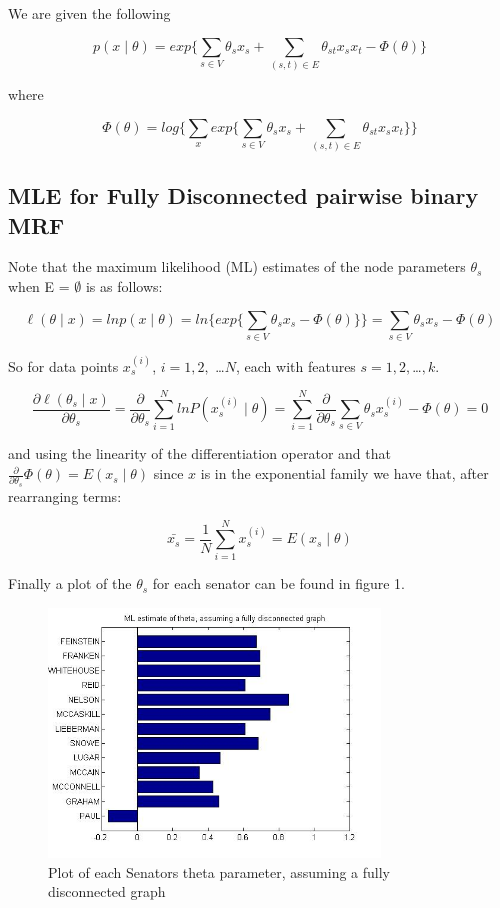 \documentclass[]{article}
\begin{document}
We are given the following

\[p(x \mid \theta) = exp \biggl\{\sum_{s \in V}  \theta_{s}x_{s} + \sum_{(s,t) \in E} \theta_{st}x_{s}x_{t}-\Phi(\theta) \biggl\}\]

where

\[
\Phi(\theta) = log \biggl\{\sum_{x} exp \biggl\{\sum_{s \in V}  \theta_{s}x_{s} + \sum_{(s,t) \in E} \theta_{st}x_{s}x_{t} \biggl\} \biggl\}
\]

\subsection{MLE for Fully Disconnected pairwise binary
MRF}\label{mle-for-fully-disconnected-pairwise-binary-mrf}

Note that the maximum likelihood (ML) estimates of the node parameters
\(\theta_s\) when E = \(\emptyset\) is as follows:

\[
\ell(\theta \mid x) = ln p(x \mid \theta) = ln \biggl\{ exp \biggl\{\sum_{s \in V}  \theta_{s}x_{s} -\Phi(\theta) \biggl\} \biggl\} = \sum_{s \in V}  \theta_{s}x_{s} - \Phi(\theta)
\]

So for data points \(x_s^{(i)}\), \(i = 1, 2,\) \ldots{}\(N\), each with
features \(s = 1, 2,\)\ldots{}\(, k\).

\[  \frac{\partial \ell(\theta_s \mid x)}{\partial \theta_s} = \frac{\partial}{\partial \theta_s} \sum_{i=1}^{N} ln P(x_s^{(i)} \mid \theta) = \sum_{i=1}^{N} \frac{\partial}{\partial \theta_s}  \sum_{s \in V}  \theta_{s}x_{s}^{(i)} - \Phi(\theta) = 0\]

and using the linearity of the differentiation operator and that
\(\frac{\partial}{\partial \theta_s} \Phi(\theta) = E(x_s \mid \theta)\)
since \(x\) is in the exponential family we have that, after rearranging
terms:

\[
\bar{x_s} = \frac{1}{N} \sum_{i=1}^{N} x_{s}^{(i)} = E(x_s \mid \theta)
\]

Finally a plot of the \(\theta_s\) for each senator can be found in
figure 1.

\begin{figure}
\begin{center}
\includegraphics[width=250pt]{fig1.jpg}
\caption{Plot of each Senators theta parameter, assuming a fully disconnected graph}
\end{center}
\end{figure}
\end{document}
